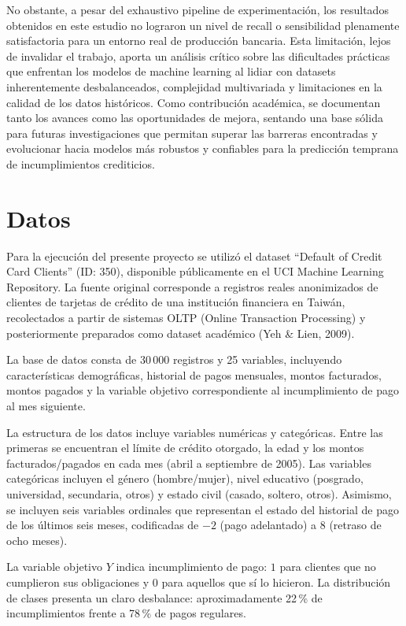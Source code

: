 \documentclass[journal]{apa7}
\begin{document}
No obstante, a pesar del exhaustivo pipeline de experimentación, los resultados obtenidos en este estudio no lograron un nivel de recall o sensibilidad plenamente satisfactoria para un entorno real de producción bancaria. Esta limitación, lejos de invalidar el trabajo, aporta un análisis crítico sobre las dificultades prácticas que enfrentan los modelos de machine learning al lidiar con datasets inherentemente desbalanceados, complejidad multivariada y limitaciones en la calidad de los datos históricos. Como contribución académica, se documentan tanto los avances como las oportunidades de mejora, sentando una base sólida para futuras investigaciones que permitan superar las barreras encontradas y evolucionar hacia modelos más robustos y confiables para la predicción temprana de incumplimientos crediticios.

\section{Datos}

Para la ejecución del presente proyecto se utilizó el dataset \enquote{Default of Credit Card Clients} (ID: 350), disponible públicamente en el UCI Machine Learning Repository. La fuente original corresponde a registros reales anonimizados de clientes de tarjetas de crédito de una institución financiera en Taiwán, recolectados a partir de sistemas OLTP (Online Transaction Processing) y posteriormente preparados como dataset académico (Yeh \& Lien, 2009).

La base de datos consta de 30\,000 registros y 25 variables, incluyendo características demográficas, historial de pagos mensuales, montos facturados, montos pagados y la variable objetivo correspondiente al incumplimiento de pago al mes siguiente.

La estructura de los datos incluye variables numéricas y categóricas. Entre las primeras se encuentran el límite de crédito otorgado, la edad y los montos facturados/pagados en cada mes (abril a septiembre de 2005). Las variables categóricas incluyen el género (hombre/mujer), nivel educativo (posgrado, universidad, secundaria, otros) y estado civil (casado, soltero, otros). Asimismo, se incluyen seis variables ordinales que representan el estado del historial de pago de los últimos seis meses, codificadas de \(-2\) (pago adelantado) a \(8\) (retraso de ocho meses). 

La variable objetivo \(Y\) indica incumplimiento de pago: \(1\) para clientes que no cumplieron sus obligaciones y \(0\) para aquellos que sí lo hicieron. La distribución de clases presenta un claro desbalance: aproximadamente 22\,\% de incumplimientos frente a 78\,\% de pagos regulares.
\end{document}
